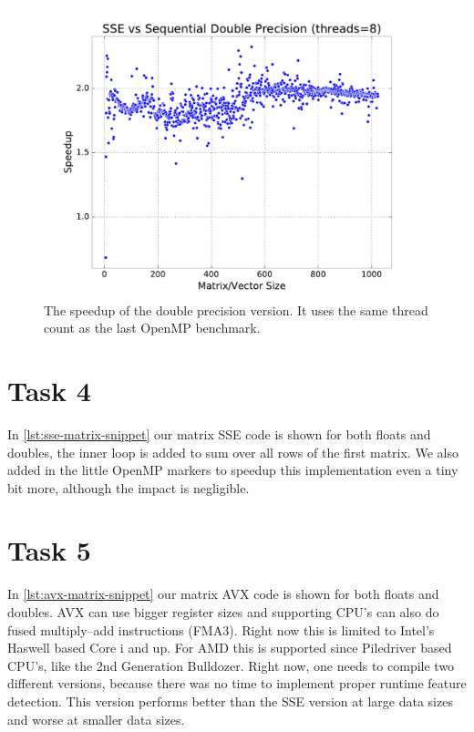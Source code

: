 \documentclass[final]{report}
\begin{document}
\begin{figure}[H]
\centering
    \includegraphics[width=\linewidth]{resources/sse-dp.pdf}
    \caption{The speedup of the double precision version. It uses the same thread count as the last OpenMP benchmark.}
    \label{fig:sse-dp}
\end{figure}


\section{Task 4}

In \cref{lst:sse-matrix-snippet} our matrix SSE code is shown for both floats and doubles, the inner loop is added to sum over all rows of the first matrix. We also added in the little OpenMP markers to speedup this implementation even a tiny bit more, although the impact is negligible.


\section{Task 5}

In \cref{lst:avx-matrix-snippet} our matrix AVX code is shown for both floats and doubles.
AVX can use bigger register sizes and supporting CPU's can also do fused multiply–add instructions (FMA3).
Right now this is limited to Intel's Haswell based Core i and up.
For AMD this is supported since Piledriver based CPU's, like the 2nd Generation Bulldozer. 
Right now, one needs to compile two different versions, because there was no time to implement proper runtime feature detection.
This version performs better than the SSE version at large data sizes and worse at smaller data sizes. 

\end{document}
